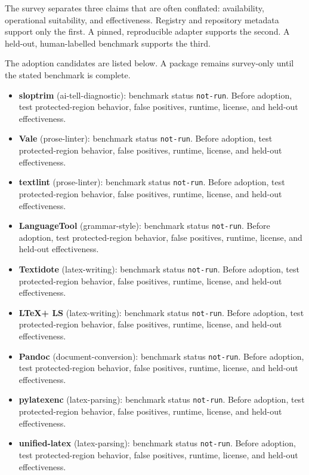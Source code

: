 \documentclass[11pt]{article}
\providecommand{\tightlist}{\setlength{\itemsep}{0pt}\setlength{\parskip}{0pt}}
\begin{document}
The survey separates three claims that are often conflated: availability, operational suitability, and effectiveness. Registry and repository metadata support only the first. A pinned, reproducible adapter supports the second. A held-out, human-labelled benchmark supports the third.

The adoption candidates are listed below. A package remains survey-only until the stated benchmark is complete.

\begin{itemize}
\tightlist
\item
  \textbf{sloptrim} (ai-tell-diagnostic): benchmark status \texttt{not-run}. Before adoption, test protected-region behavior, false positives, runtime, license, and held-out effectiveness.
\item
  \textbf{Vale} (prose-linter): benchmark status \texttt{not-run}. Before adoption, test protected-region behavior, false positives, runtime, license, and held-out effectiveness.
\item
  \textbf{textlint} (prose-linter): benchmark status \texttt{not-run}. Before adoption, test protected-region behavior, false positives, runtime, license, and held-out effectiveness.
\item
  \textbf{LanguageTool} (grammar-style): benchmark status \texttt{not-run}. Before adoption, test protected-region behavior, false positives, runtime, license, and held-out effectiveness.
\item
  \textbf{Textidote} (latex-writing): benchmark status \texttt{not-run}. Before adoption, test protected-region behavior, false positives, runtime, license, and held-out effectiveness.
\item
  \textbf{LTeX+ LS} (latex-writing): benchmark status \texttt{not-run}. Before adoption, test protected-region behavior, false positives, runtime, license, and held-out effectiveness.
\item
  \textbf{Pandoc} (document-conversion): benchmark status \texttt{not-run}. Before adoption, test protected-region behavior, false positives, runtime, license, and held-out effectiveness.
\item
  \textbf{pylatexenc} (latex-parsing): benchmark status \texttt{not-run}. Before adoption, test protected-region behavior, false positives, runtime, license, and held-out effectiveness.
\item
  \textbf{unified-latex} (latex-parsing): benchmark status \texttt{not-run}. Before adoption, test protected-region behavior, false positives, runtime, license, and held-out effectiveness.

\end{itemize}
\end{document}
